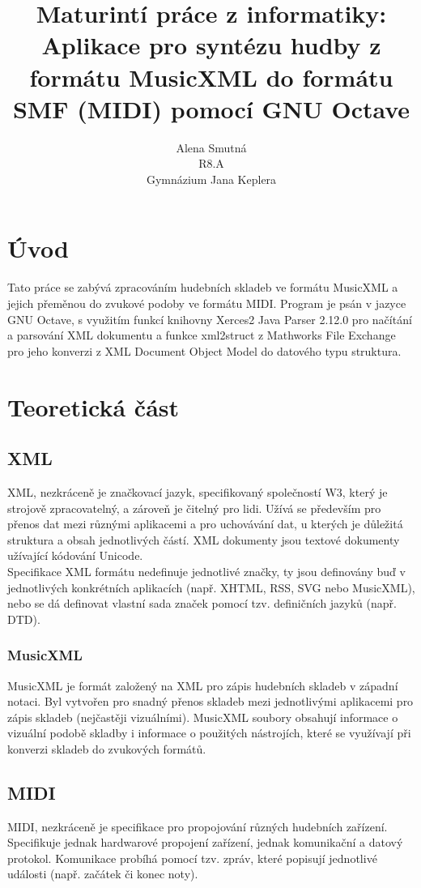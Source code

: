 \documentclass[12pt,a4paper,titlepage]{article}
\title{Maturintí práce z informatiky:\\
	Aplikace pro syntézu hudby z formátu MusicXML do formátu SMF (MIDI) pomocí GNU Octave}
\author{Alena Smutná\\
	R8.A\\
	Gymnázium Jana Keplera\\}
\begin{document}
\maketitle
\tableofcontents
\newpage
\section{Úvod}
Tato práce se zabývá zpracováním hudebních skladeb ve formátu MusicXML a jejich přeměnou do zvukové podoby ve formátu MIDI. Program je psán v jazyce GNU Octave, s využitím funkcí knihovny Xerces2 Java Parser 2.12.0 pro načítání a parsování XML dokumentu a funkce xml2struct z Mathworks File Exchange pro jeho konverzi z XML Document Object Model do datového typu struktura.
\newpage
\section{Teoretická část}
\subsection{XML}
XML, nezkráceně  je značkovací jazyk, specifikovaný společností W3, který je strojově zpracovatelný, a zároveň je čitelný pro lidi. Užívá se především pro přenos dat mezi různými aplikacemi a pro uchovávání dat, u kterých je důležitá struktura a obsah jednotlivých částí. XML dokumenty jsou textové dokumenty užívající kódování Unicode.
\\
Specifikace XML formátu nedefinuje jednotlivé značky, ty jsou definovány buď v jednotlivých konkrétních aplikacích (např. XHTML, RSS, SVG nebo MusicXML), nebo se dá definovat vlastní sada značek pomocí tzv. definičních jazyků (např. DTD). 
\subsubsection{MusicXML}
MusicXML je formát založený na XML pro zápis hudebních skladeb v západní notaci. Byl vytvořen pro snadný přenos skladeb mezi jednotlivými aplikacemi pro zápis skladeb (nejčastěji vizuálními). MusicXML soubory obsahují informace o vizuální podobě skladby i informace o použitých nástrojích, které se využívají při konverzi skladeb do zvukových formátů.
\subsection{MIDI}
MIDI, nezkráceně  je specifikace pro propojování různých hudebních zařízení. Specifikuje jednak hardwarové propojení zařízení, jednak komunikační a datový protokol. Komunikace probíhá pomocí tzv. zpráv, které popisují jednotlivé události (např. začátek či konec noty).
\end{document}
